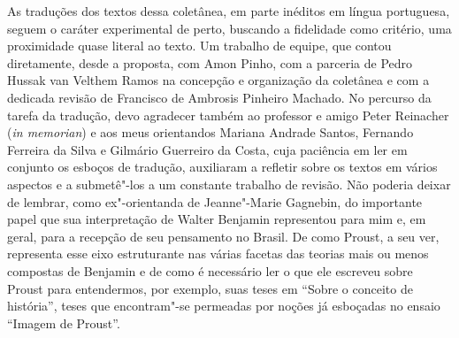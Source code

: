As traduções dos textos dessa coletânea, em parte inéditos em língua
portuguesa, seguem o caráter experimental de perto, buscando a fidelidade
como critério, uma proximidade quase literal ao texto. Um trabalho de
equipe, que contou diretamente, desde a proposta, com Amon Pinho, com a
parceria de Pedro Hussak van Velthem Ramos na concepção e organização da coletânea e com a
dedicada revisão de Francisco de Ambrosis Pinheiro Machado. No percurso
da tarefa da tradução, devo agradecer também ao professor e amigo Peter
Reinacher (\emph{in memorian}) e aos meus orientandos Mariana Andrade Santos, Fernando
Ferreira da Silva e Gilmário Guerreiro da Costa, cuja paciência em ler
em conjunto os esboços de tradução, auxiliaram a refletir sobre os
textos em vários aspectos e a submetê"-los a um constante trabalho de
revisão. Não poderia deixar de lembrar, como ex"-orientanda de Jeanne"-Marie Gagnebin, do importante papel que sua interpretação de Walter Benjamin representou para mim e, em geral, para a recepção de seu pensamento no Brasil. De como Proust, a seu ver, representa esse eixo estruturante nas várias facetas das teorias mais ou menos compostas de Benjamin e de como é necessário ler o que ele escreveu sobre Proust para entendermos, por exemplo, suas teses em ``Sobre o conceito de história'', teses que encontram"-se permeadas por noções já esboçadas no ensaio ``Imagem de Proust''. 
